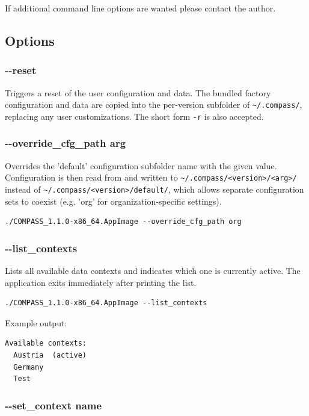 If additional command line options are wanted please contact the author.

\subsection{Options}

\subsubsection{-{}-reset}

Triggers a reset of the user configuration and data. The bundled factory configuration and data are copied into the per-version subfolder of \texttt{\textasciitilde/.compass/}, replacing any user customizations. The short form \texttt{-r} is also accepted.

\subsubsection{-{}-override\_cfg\_path arg}

Overrides the 'default' configuration subfolder name with the given value. Configuration is then read from and written to \texttt{\textasciitilde/.compass/<version>/<arg>/} instead of \texttt{\textasciitilde/.compass/<version>/default/}, which allows separate configuration sets to coexist (e.g. 'org' for organization-specific settings).

\begin{lstlisting}
./COMPASS_1.1.0-x86_64.AppImage --override_cfg_path org
\end{lstlisting}

\subsubsection{-{}-list\_contexts}

Lists all available data contexts and indicates which one is currently active. The application exits immediately after printing the list.

\begin{lstlisting}
./COMPASS_1.1.0-x86_64.AppImage --list_contexts
\end{lstlisting}

Example output:
\begin{lstlisting}
Available contexts:
  Austria  (active)
  Germany
  Test
\end{lstlisting}

\subsubsection{-{}-set\_context name}

